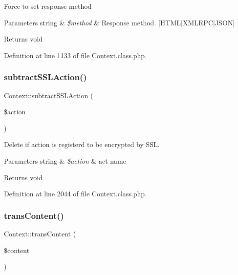 Force to set response method


\begin{DoxyParams}[1]{Parameters}
string & {\em \$method} & Response method. \mbox{[}H\+T\+M\+L$\vert$\+X\+M\+L\+R\+P\+C$\vert$\+J\+S\+ON\mbox{]} \\
\hline
\end{DoxyParams}
\begin{DoxyReturn}{Returns}
void 
\end{DoxyReturn}


Definition at line 1133 of file Context.\+class.\+php.

\hypertarget{classContext_a598cb5c571c0a1ffb15f67064e251f0d}{}\label{classContext_a598cb5c571c0a1ffb15f67064e251f0d} 
\subsubsection{\texorpdfstring{subtract\+S\+S\+L\+Action()}{subtractSSLAction()}}
{\footnotesize\ttfamily Context\+::subtract\+S\+S\+L\+Action (\begin{DoxyParamCaption}\item[{}]{\$action }\end{DoxyParamCaption})}

Delete if action is registerd to be encrypted by S\+SL.


\begin{DoxyParams}[1]{Parameters}
string & {\em \$action} & act name \\
\hline
\end{DoxyParams}
\begin{DoxyReturn}{Returns}
void 
\end{DoxyReturn}


Definition at line 2044 of file Context.\+class.\+php.

\hypertarget{classContext_a4767b003bd726a994b1bf6bf68a3bb7e}{}\label{classContext_a4767b003bd726a994b1bf6bf68a3bb7e} 
\subsubsection{\texorpdfstring{trans\+Content()}{transContent()}}
{\footnotesize\ttfamily Context\+::trans\+Content (\begin{DoxyParamCaption}\item[{}]{\$content }\end{DoxyParamCaption})}

